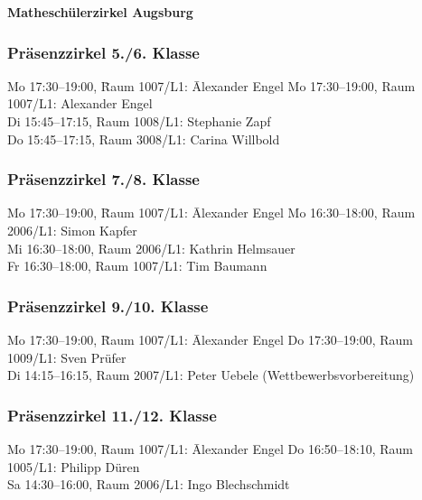 \documentclass[a4paper,ngerman,14pt]{scrartcl}
\begin{document}
\onehalfspacing

\begin{raggedright}
\Large\textbf{Matheschülerzirkel Augsburg}
\end{raggedright}
\vspace{0.2em}

\subsubsection*{Präsenzzirkel 5./6. Klasse}
\begin{tabbing}
  Mo 17:30–19:00, \= Raum 1007/L1: \= Alexander Engel \kill
  Mo 17:30–19:00, \> Raum 1007/L1: \> Alexander Engel \\
  Di 15:45–17:15, \> Raum 1008/L1: \> Stephanie Zapf \\
  Do 15:45–17:15, \> Raum 3008/L1: \> Carina Willbold
\end{tabbing}

\subsubsection*{Präsenzzirkel 7./8. Klasse}

\begin{tabbing}
  Mo 17:30–19:00, \= Raum 1007/L1: \= Alexander Engel \kill
  Mo 16:30–18:00, \> Raum 2006/L1: \> Simon Kapfer \\
  Mi 16:30–18:00, \> Raum 2006/L1: \> Kathrin Helmsauer \\
  Fr 16:30–18:00, \> Raum 1007/L1: \> Tim Baumann
\end{tabbing}

\subsubsection*{Präsenzzirkel 9./10. Klasse}

\begin{tabbing}
  Mo 17:30–19:00, \= Raum 1007/L1: \= Alexander Engel \kill
  Do 17:30–19:00, \> Raum 1009/L1: \> Sven Prüfer \\
  Di 14:15–16:15, \> Raum 2007/L1: \> Peter Uebele (Wettbewerbsvorbereitung)
\end{tabbing}

\subsubsection*{Präsenzzirkel 11./12. Klasse}

\begin{tabbing}
  Mo 17:30–19:00, \= Raum 1007/L1: \= Alexander Engel \kill
  Do 16:50–18:10, \> Raum 1005/L1: \> Philipp Düren \\
  Sa 14:30–16:00, \> Raum 2006/L1: \> Ingo Blechschmidt
\end{tabbing}
\end{document}
